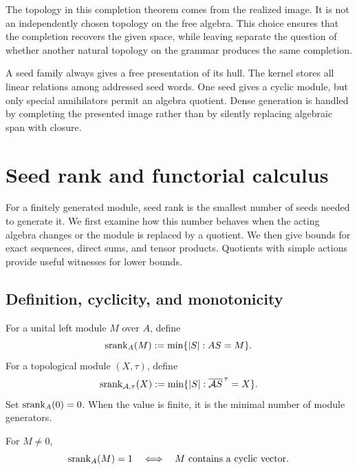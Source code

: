 The topology in this completion theorem comes from the realized image.  It is not an independently chosen topology on the free algebra.  This choice ensures that the completion recovers the given space, while leaving separate the question of whether another natural topology on the grammar produces the same completion.

\begin{sectionrecap}
A seed family always gives a free presentation of its hull.  The kernel stores all linear relations among addressed seed words.  One seed gives a cyclic module, but only special annihilators permit an algebra quotient.  Dense generation is handled by completing the presented image rather than by silently replacing algebraic span with closure.
\end{sectionrecap}

\section{Seed rank and functorial calculus}



\begin{readerroadmap}
For a finitely generated module, seed rank is the smallest number of seeds needed to generate it.  We first examine how this number behaves when the acting algebra changes or the module is replaced by a quotient.  We then give bounds for exact sequences, direct sums, and tensor products.  Quotients with simple actions provide useful witnesses for lower bounds.
\end{readerroadmap}
\subsection{Definition, cyclicity, and monotonicity}

\begin{definition}
\label{def:seed-rank}
For a unital left module $M$ over $A$, define
\[
\operatorname{srank}_A(M):=\min\{|S|:AS=M\}.
\]
For a topological module $(X,\tau)$, define
\[
\operatorname{srank}_{\mathcal A,\tau}(X):=\min\{|S|:\overline{\mathcal A S}^{\,\tau}=X\}.
\]
Set $\operatorname{srank}_A(0)=0$.  When the value is finite, it is the minimal number of module generators.
\end{definition}

\begin{proposition}
\label{prop:cyclic-characterization}
For $M\neq0$,
\[
\operatorname{srank}_A(M)=1
\quad\Longleftrightarrow\quad
M\text{ contains a cyclic vector}.
\]
\end{proposition}

